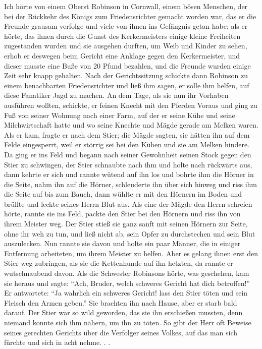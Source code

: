 Ich hörte von einem Oberst Robinson in Cornwall, einem
bösen Menschen, der bei der Rückkehr des Königs zum 
Friedensrichter gemacht worden war, das er die Freunde grausam 
verfolge und viele von ihnen ins Gefängnis getan habe; als er hörte,
das ihnen durch die Gunst des Kerkermeisters einige kleine 
Freiheiten zugestanden wurden und sie ausgehen durften, um Weib
und Kinder zu sehen, erhob er deswegen beim Gericht eine Anklage 
gegen den Kerkermeister, und dieser musste eine Buße von
20 Pfund bezahlen, und die Freunde wurden einige Zeit sehr knapp
gehalten. Nach der Gerichtssitzung schickte dann Robinson zu
einem benachbarten Friedensrichter und ließ ihm sagen, er solle
ihm helfen, auf diese Fanatiker Jagd zu machen. An dem Tage,
als sie nun ihr Vorhaben ausführen wollten, schickte, er feinen
Knecht mit den Pferden Voraus und ging zu Fuß von seiner
Wohnung nach einer Farm, auf der er seine Kühe und seine
Milchwirtschaft hatte und wo seine Knechte und Mägde gerade
am Melken waren. Als er kam, fragte er nach dem Stier; die
Mägde sagten, sie hätten ihn auf dem Felde eingesperrt, weil er
störrig sei bei den Kühen und sie am Melken hindere. Da ging
er ins Feld und begann nach seiner Gewohnheit seinen Stock gegen
den Stier zu schwingen, der Stier schnaubte nach ihm und holte
nach rückwärts aus, dann kehrte er sich und rannte wütend auf
ihn los und bohrte ihm die Hörner in die Seite, nahm ihn auf
die Hörner, schleuderte ihn über sich hinweg und riss ihm die Seite
auf bis zum Bauch, dann wühlte er mit den Hörnern im Boden
und brüllte und leckte seines Herrn Blut aus. Als eine der
Mägde den Herrn schreien hörte, rannte sie ins Feld, packte den
Stier bei den Hörnern und riss ihn von ihrem Meister weg.
Der Stier stieß sie ganz sanft mit seinen Hörnern zur Seite, ohne
ihr weh zu tun, und ließ nicht ab, sein Opfer zu durchstechen und
sein Blut auszulecken. Nun rannte sie davon und holte ein paar
Männer, die in einiger Entfernung arbeiteten, um ihrem Meister
zu helfen. Aber es gelang ihnen erst den Stier weg zubringen, als
sie die Kettenhunde auf ihn hetzten, da rannte er wutschnaubend
davon. Als die Schwester Robinsons hörte, was geschehen, kam
sie heraus und sagte: "`Ach, Bruder, welch schweres Gericht hat
dich betroffen!"' Er antwortete: "`Ja wahrlich ein schweres 
Gericht! lass den Stier töten und sein Fleisch den Armen geben."'
Sie brachten ihn nach Hause, aber er starb bald darauf. Der
Stier war so wild geworden, das sie ihn erschießen mussten, denn
niemand konnte sich ihm nähern, um ihn zu töten. So gibt der
Herr oft Beweise seines gerechten Gerichts über die Verfolger
seines Volkes, auf das man sich fürchte und sich in acht nehme. . .

